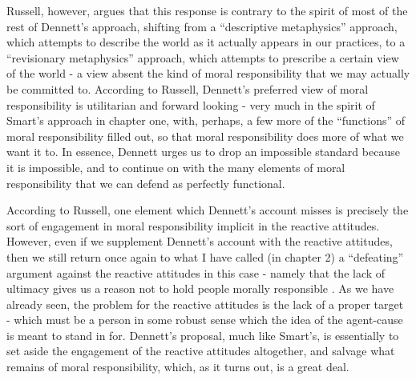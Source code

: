 \documentclass[phd,12pt,oneside,paper=letterpaper]{ubcthesis}
\begin{document}
Russell, however, argues that this response is contrary to the spirit of most of the rest of Dennett's approach, shifting from a ``descriptive metaphysics'' approach, which attempts to describe the world as it actually appears in our practices, to a ``revisionary metaphysics'' approach, which attempts to prescribe a certain view of the world - a view absent the kind of moral responsibility that we may actually be committed to. According to Russell, Dennett's preferred view of moral responsibility is utilitarian and forward looking \citep{russell2002} - very much in the spirit of Smart's approach in chapter one, with, perhaps, a few more of the ``functions'' of moral responsibility filled out, so that moral responsibility does more of what we want it to. In essence, Dennett urges us to drop an impossible standard because it is impossible, and to continue on with the many elements of moral responsibility that we can defend as perfectly functional. 

According to Russell, one element which Dennett's account misses is precisely the sort of engagement in moral responsibility implicit in the reactive attitudes. However, even if we supplement Dennett's account with the reactive attitudes, then we still return once again to what I have called (in chapter 2) a ``defeating'' argument against the reactive attitudes in this case - namely that the lack of ultimacy gives us a reason not to hold people morally responsible \citep{russell2002}. As we have already seen, the problem for the reactive attitudes is the lack of a proper target - which must be a person in some robust sense which the idea of the agent-cause is meant to stand in for. Dennett's proposal, much like Smart's, is essentially to set aside the engagement of the reactive attitudes altogether, and salvage what remains of moral responsibility, which, as it turns out, is a great deal.
\end{document}
